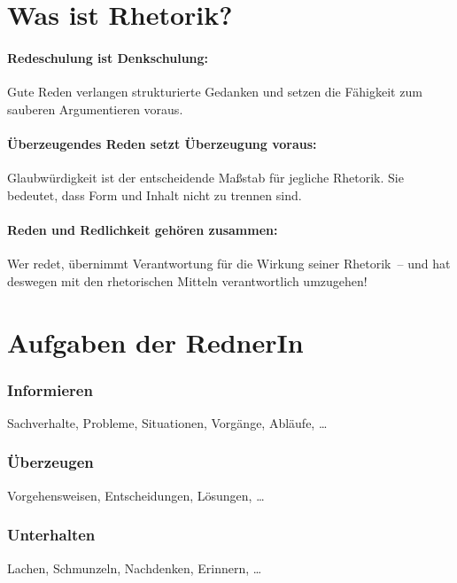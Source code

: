 \section{Was ist Rhetorik?}
\label{was-ist-rhetorik}

\paragraph*{Redeschulung ist Denkschulung:} Gute Reden verlangen strukturierte Gedanken und setzen die Fähigkeit zum sauberen Argumentieren voraus.
\paragraph*{Überzeugendes Reden setzt Überzeugung voraus:} Glaubwürdigkeit ist der entscheidende Maßstab für jegliche Rhetorik. Sie bedeutet, dass Form und Inhalt nicht zu trennen sind.
\paragraph*{Reden und Redlichkeit gehören zusammen:} Wer redet, übernimmt Verantwortung für die Wirkung seiner Rhetorik~-- und hat deswegen mit den rhetorischen Mitteln verantwortlich umzugehen!

\section{Aufgaben der RednerIn}
\subsubsection{Informieren}
Sachverhalte, Probleme, Situationen, Vorgänge, Abläufe, \ldots

\subsubsection{Überzeugen}
Vorgehensweisen, Entscheidungen, Lösungen, \ldots

\subsubsection{Unterhalten}
Lachen, Schmunzeln, Nachdenken, Erinnern, \ldots
